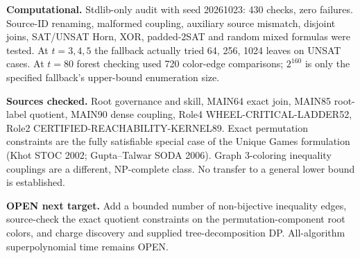 \documentclass{article}
\begin{document}
\textbf{Computational.} Stdlib-only audit with seed 20261023: 430 checks, zero failures. Source-ID renaming, malformed coupling, auxiliary source mismatch, disjoint joins, SAT/UNSAT Horn, XOR, padded-2SAT and random mixed formulas were tested. At $t=3,4,5$ the fallback actually tried 64, 256, 1024 leaves on UNSAT cases. At $t=80$ forest checking used 720 color-edge comparisons; $2^{160}$ is only the specified fallback's upper-bound enumeration size.

\textbf{Sources checked.} Root governance and skill, MAIN64 exact join, MAIN85 root-label quotient, MAIN90 dense coupling, Role4 WHEEL-CRITICAL-LADDER52, Role2 CERTIFIED-REACHABILITY-KERNEL89. Exact permutation constraints are the fully satisfiable special case of the Unique Games formulation (Khot STOC 2002; Gupta--Talwar SODA 2006). Graph 3-coloring inequality couplings are a different, NP-complete class. No transfer to a general lower bound is established.

\textbf{OPEN next target.} Add a bounded number of non-bijective inequality edges, source-check the exact quotient constraints on the permutation-component root colors, and charge discovery and supplied tree-decomposition DP. All-algorithm superpolynomial time remains OPEN.
\end{document}
